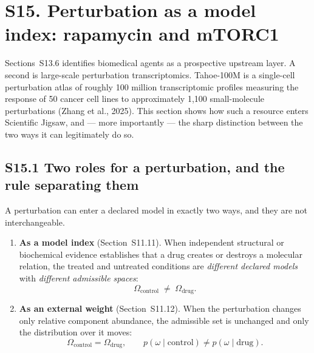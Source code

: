 %
%

\section*{S15. Perturbation as a model index: rapamycin and mTORC1}

Sections~S13.6 identifies biomedical agents as a prospective upstream layer.
A second is large-scale perturbation transcriptomics. Tahoe-100M is a
single-cell perturbation atlas of roughly 100 million transcriptomic profiles
measuring the response of 50 cancer cell lines to approximately 1{,}100
small-molecule perturbations (Zhang et al., 2025). This section shows how such
a resource enters Scientific Jigsaw, and --- more importantly --- the sharp
distinction between the two ways it can legitimately do so.

\subsection*{S15.1 Two roles for a perturbation, and the rule separating them}

A perturbation can enter a declared model in exactly two ways, and they are not
interchangeable.

\begin{enumerate}
\item \textbf{As a model index} (Section~S11.11). When independent structural or
biochemical evidence establishes that a drug creates or destroys a molecular
relation, the treated and untreated conditions are \emph{different declared
models} with \emph{different admissible spaces}:
\[
\Omega_{\mathrm{control}} \;\neq\; \Omega_{\mathrm{drug}}.
\]
\item \textbf{As an external weight} (Section~S11.12). When the perturbation
changes only relative component abundance, the admissible set is unchanged and
only the distribution over it moves:
\[
\Omega_{\mathrm{control}} = \Omega_{\mathrm{drug}}, \qquad
p(\omega \mid \mathrm{control}) \neq p(\omega \mid \mathrm{drug}).
\]
\end{enumerate}

